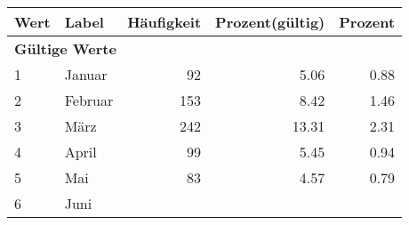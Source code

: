      \begin{longtable}{lXrrr}
     \toprule
     \textbf{Wert} & \textbf{Label} & \textbf{Häufigkeit} & \textbf{Prozent(gültig)} & \textbf{Prozent} \\
     \endhead
     \midrule
     \multicolumn{5}{l}{\textbf{Gültige Werte}}\\

     1 &
     \multicolumn{1}{X}{ Januar   } &


       \num{92} &
       \num[round-mode=places,round-precision=2]{5.06} &
         \num[round-mode=places,round-precision=2]{0.88} \\

     2 &
     \multicolumn{1}{X}{ Februar   } &


       \num{153} &
       \num[round-mode=places,round-precision=2]{8.42} &
         \num[round-mode=places,round-precision=2]{1.46} \\

     3 &
     \multicolumn{1}{X}{ März   } &


       \num{242} &
       \num[round-mode=places,round-precision=2]{13.31} &
         \num[round-mode=places,round-precision=2]{2.31} \\

     4 &
     \multicolumn{1}{X}{ April   } &


       \num{99} &
       \num[round-mode=places,round-precision=2]{5.45} &
         \num[round-mode=places,round-precision=2]{0.94} \\

     5 &
     \multicolumn{1}{X}{ Mai   } &


       \num{83} &
       \num[round-mode=places,round-precision=2]{4.57} &
         \num[round-mode=places,round-precision=2]{0.79} \\

     6 &
     \multicolumn{1}{X}{ Juni   } &



\end{longtable}
